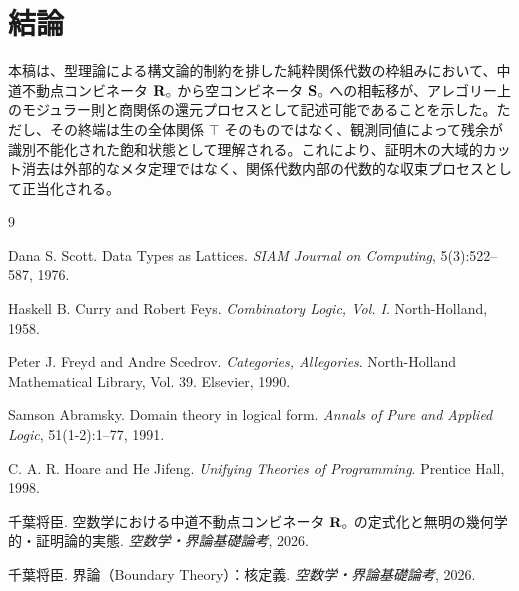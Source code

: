 \documentclass[11pt,a4paper]{ltjsarticle}
\theoremstyle{definition}
\begin{document}
\section{結論}
本稿は、型理論による構文論的制約を排した純粋関係代数の枠組みにおいて、中道不動点コンビネータ $\mathbf{R}_{\circ}$ から空コンビネータ $\mathbf{S}_{\circ}$ への相転移が、アレゴリー上のモジュラー則と商関係の還元プロセスとして記述可能であることを示した。ただし、その終端は生の全体関係 $\top$ そのものではなく、観測同値によって残余が識別不能化された飽和状態として理解される。これにより、証明木の大域的カット消去は外部的なメタ定理ではなく、関係代数内部の代数的な収束プロセスとして正当化される。

\begin{thebibliography}{9}

Dana S. Scott.
\newblock Data Types as Lattices.
\newblock \emph{SIAM Journal on Computing}, 5(3):522--587, 1976.

Haskell B. Curry and Robert Feys.
\newblock \emph{Combinatory Logic, Vol. I}.
\newblock North-Holland, 1958.

Peter J. Freyd and Andre Scedrov.
\newblock \emph{Categories, Allegories}.
\newblock North-Holland Mathematical Library, Vol. 39. Elsevier, 1990.

Samson Abramsky.
\newblock Domain theory in logical form.
\newblock \emph{Annals of Pure and Applied Logic}, 51(1-2):1--77, 1991.

C. A. R. Hoare and He Jifeng.
\newblock \emph{Unifying Theories of Programming}.
\newblock Prentice Hall, 1998.

千葉将臣.
\newblock 空数学における中道不動点コンビネータ $\mathbf{R}_{\circ}$ の定式化と無明の幾何学的・証明論的実態.
\newblock \emph{空数学・界論基礎論考}, 2026.

千葉将臣.
\newblock 界論（Boundary Theory）：核定義.
\newblock \emph{空数学・界論基礎論考}, 2026.

\end{thebibliography}
\end{document}

